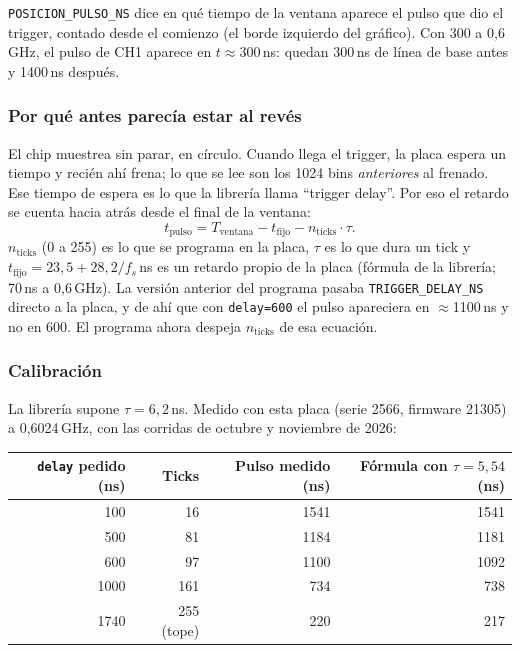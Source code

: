 \documentclass[11pt,a4paper]{article}
\newcommand{\code}[1]{\texttt{#1}}
\begin{document}
\code{POSICION\_PULSO\_NS} dice en qué tiempo de la ventana aparece el pulso que dio
el trigger, contado desde el comienzo (el borde izquierdo del gráfico). Con 300 a
0{,}6\,GHz, el pulso de CH1 aparece en $t \approx 300$\,ns: quedan 300\,ns de línea
de base antes y 1400\,ns después.

\subsubsection*{Por qué antes parecía estar al revés}

El chip muestrea sin parar, en círculo. Cuando llega el trigger, la placa espera un
tiempo y recién ahí frena; lo que se lee son los 1024 bins \emph{anteriores} al
frenado. Ese tiempo de espera es lo que la librería llama ``trigger delay''. Por eso
el retardo se cuenta hacia atrás desde el final de la ventana:
\[
  t_{\text{pulso}} = T_{\text{ventana}} - t_{\text{fijo}} - n_{\text{ticks}} \cdot \tau .
\]
$n_{\text{ticks}}$ (0 a 255) es lo que se programa en la placa, $\tau$ es lo que dura
un tick y $t_{\text{fijo}} = 23{,}5 + 28{,}2/f_s$\,ns es un retardo propio de la
placa (fórmula de la librería; 70\,ns a 0{,}6\,GHz). La versión anterior del programa
pasaba \code{TRIGGER\_DELAY\_NS} directo a la placa, y de ahí que con \code{delay=600}
el pulso apareciera en $\approx$1100\,ns y no en 600. El programa ahora despeja
$n_{\text{ticks}}$ de esa ecuación.

\subsubsection*{Calibración}

La librería supone $\tau = 6{,}2$\,ns. Medido con esta placa (serie 2566, firmware
21305) a 0{,}6024\,GHz, con las corridas de octubre y noviembre de 2026:

\begin{center}
\begin{tabular}{rrrr}
\toprule
\code{delay} pedido (ns) & Ticks & Pulso medido (ns) & Fórmula con $\tau=5{,}54$ (ns) \\
\midrule
100 & 16 & 1541 & 1541 \\
500 & 81 & 1184 & 1181 \\
600 & 97 & 1100 & 1092 \\
1000 & 161 & 734 & 738 \\
1740 & 255 (tope) & 220 & 217 \\
\bottomrule
\end{tabular}
\end{center}
\end{document}
